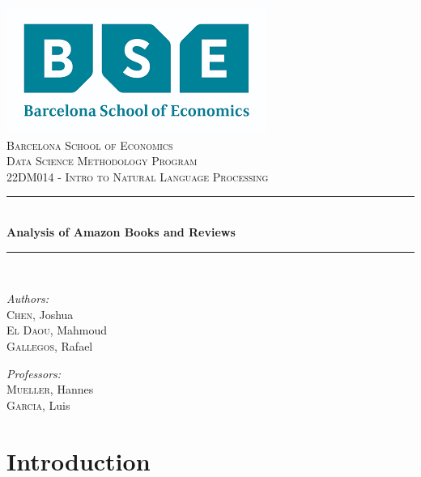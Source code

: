 \documentclass[12pt]{article}
\date{\today}							%
\numberwithin{equation}{section}
\begin{document}
\begin{titlepage}
	\centering
    \includegraphics[scale = 0.7]{bse_logo.png}\\[1.2 cm]	%
    \textsc{\LARGE Barcelona School of Economics}\\[2.0 cm]	%
	\textsc{\Large Data Science Methodology Program}\\[0.5 cm]				%
	\textsc{\large 22DM014 - Intro to Natural Language Processing }\\[0.5 cm]				%
	\rule{\linewidth}{0.2 mm} \\[0.4 cm]
	{ \huge \bfseries Analysis of Amazon Books and Reviews }\\
	\rule{ \linewidth}{0.2 mm} \\[1.5 cm]
	
\begin{center}
    
{ \emph{Authors: }\\
    \textsc{Chen}, Joshua \\
    \textsc{El Daou}, Mahmoud \\ 
    \textsc{Gallegos}, Rafael \\} 

\vspace{0.7cm}
    \textit{Professors:}\\  \textsc{Mueller}, Hannes \\
    	\textsc{Garcia}, Luis
        \\ \vspace{0.5cm}
\vspace{1.7cm}

 \end{center}
	\vfill
	
\end{titlepage}
	
\tableofcontents
\vspace{1cm}
\listoffigures
\listoftables
\pagebreak

\newpage

\section{Introduction}
\end{document}
